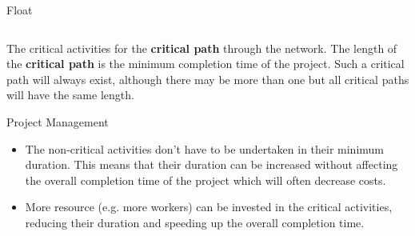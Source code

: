 \documentclass[8pt]{beamer}
\begin{document}
\begin{frame}[allowframebreaks]{Float}
\begin{columns}
\begin{column}{0.4\textwidth}
\begin{center}
\end{center}
	\end{column}
\end{columns}

\begin{definition}
	The critical activities for the \textbf{critical path} through the network. The length of the \textbf{critical path} is the minimum completion time of the project. Such a critical path will always exist, although there may be more than one but all critical paths will have the same length. 
	
\end{definition}

\end{frame}

\begin{frame}{Project Management}
	\begin{itemize}
		\item The non-critical activities don’t have to be undertaken in their minimum duration. This
means that their duration can be increased without affecting the overall completion
time of the project which will often decrease costs.
\item More resource (e.g. more workers) can be invested in the critical activities, reducing
their duration and speeding up the overall completion time.
	\end{itemize}
\end{frame}
\end{document}
